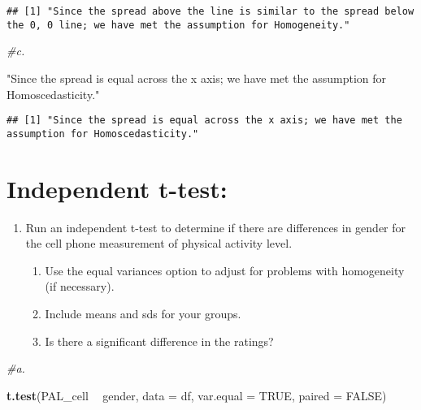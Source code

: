 \documentclass[
]{article}
\newenvironment{Shaded}{\begin{snugshade}}{\end{snugshade}}
\newcommand{\CommentTok}[1]{\textcolor[rgb]{0.56,0.35,0.01}{\textit{#1}}}
\newcommand{\DataTypeTok}[1]{\textcolor[rgb]{0.13,0.29,0.53}{#1}}
\newcommand{\KeywordTok}[1]{\textcolor[rgb]{0.13,0.29,0.53}{\textbf{#1}}}
\newcommand{\NormalTok}[1]{#1}
\newcommand{\OperatorTok}[1]{\textcolor[rgb]{0.81,0.36,0.00}{\textbf{#1}}}
\newcommand{\OtherTok}[1]{\textcolor[rgb]{0.56,0.35,0.01}{#1}}
\newcommand{\StringTok}[1]{\textcolor[rgb]{0.31,0.60,0.02}{#1}}
\providecommand{\tightlist}{%
  \setlength{\itemsep}{0pt}\setlength{\parskip}{0pt}}
\begin{document}
\begin{verbatim}
## [1] "Since the spread above the line is similar to the spread below the 0, 0 line; we have met the assumption for Homogeneity."
\end{verbatim}

\begin{Shaded}
\begin{Highlighting}[]
\CommentTok{#c.}

\StringTok{"Since the spread is equal across the x axis; we have met the assumption for Homoscedasticity."}
\end{Highlighting}
\end{Shaded}

\begin{verbatim}
## [1] "Since the spread is equal across the x axis; we have met the assumption for Homoscedasticity."
\end{verbatim}

\hypertarget{independent-t-test}{%
\section{Independent t-test:}\label{independent-t-test}}

\begin{enumerate}
\def\labelenumi{\arabic{enumi})}
\tightlist
\item
  Run an independent t-test to determine if there are differences in
  gender for the cell phone measurement of physical activity level.

  \begin{enumerate}
  \def\labelenumii{\alph{enumii}.}
  \tightlist
  \item
    Use the equal variances option to adjust for problems with
    homogeneity (if necessary).
  \item
    Include means and sds for your groups.
  \item
    Is there a significant difference in the ratings?
  \end{enumerate}
\end{enumerate}

\begin{Shaded}
\begin{Highlighting}[]
\CommentTok{#a.}

\KeywordTok{t.test}\NormalTok{(PAL_cell }\OperatorTok{~}\StringTok{ }\NormalTok{gender, }\DataTypeTok{data =}\NormalTok{ df, }\DataTypeTok{var.equal =} \OtherTok{TRUE}\NormalTok{, }\DataTypeTok{paired =} \OtherTok{FALSE}\NormalTok{)}
\end{Highlighting}
\end{Shaded}
\end{document}
